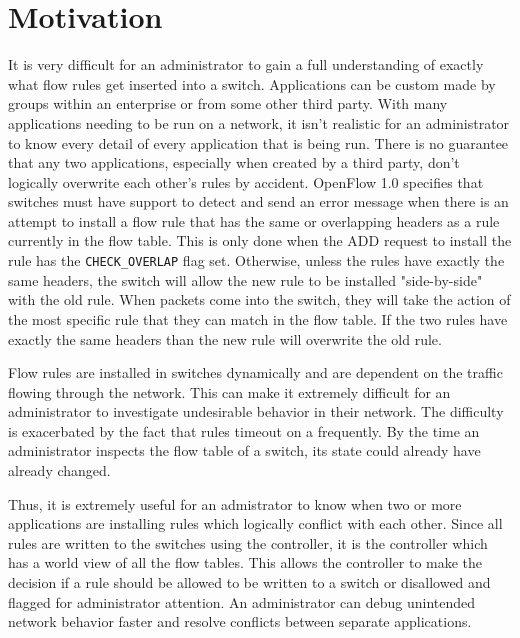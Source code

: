 \section{Motivation}
\label{sec:motivation}

It is very difficult for an administrator to gain a full understanding of exactly what flow rules get inserted into a switch. 
Applications can be custom made by groups within an enterprise or from some other third party.
With many applications needing to be run on a network, it isn't realistic for an administrator to know every detail of every application that is being run.
There is no guarantee that any two applications, especially when created by a third party, don't logically overwrite each other's rules by accident.
OpenFlow 1.0 specifies that switches must have support to detect and send an error message when there is an attempt to install a flow rule that has the same or overlapping headers as a rule currently in the flow table.
This is only done when the ADD request to install the rule has the \texttt{CHECK\_OVERLAP} flag set.
Otherwise, unless the rules have exactly the same headers, the switch will allow the new rule to be installed "side-by-side" with the old rule.
When packets come into the switch, they will take the action of the most specific rule that they can match in the flow table.
If the two rules have exactly the same headers than the new rule will overwrite the old rule.

Flow rules are installed in switches dynamically and are dependent on the traffic flowing through the network.
This can make it extremely difficult for an administrator to investigate undesirable behavior in their network.
The difficulty is exacerbated by the fact that rules timeout on a frequently.
By the time an administrator inspects the flow table of a switch, its state could already have already changed.

Thus, it is extremely useful for an admistrator to know when two or more applications are installing rules which logically conflict with each other.
Since all rules are written to the switches using the controller, it is the controller which has a world view of all the flow tables.
This allows the controller to make the decision if a rule should be allowed to be written to a switch or disallowed and flagged for administrator attention.
An administrator can debug unintended network behavior faster and resolve conflicts between separate applications.

